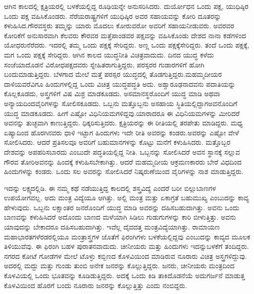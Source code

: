 ಆಗಿನ ಕಾಲದಲ್ಲಿ ಕ್ಷತ್ರಿಯರಲ್ಲಿ ಬಳಕೆಯಲ್ಲಿದ್ದ ರೂಢಿಯನ್ನೇ ಅನುಸರಿಸಿದರು. ದುರ್ಯೋಧನ ಒಂದು ಪಕ್ಷ, ಯುಧಿಷ್ಠಿರ ಒಂದು ಪಕ್ಷ ವಹಿಸಿಕೊಂಡರು. ನೆರೆಯ\break ರಾಷ್ಟ್ರಗಳಿಗೆ ಯುಧಿಷ್ಠಿರ ಅವರ ಸಹಾಯವನ್ನು ಕೋರಿ ದೂತರನ್ನು ಕಳುಹಿಸಿದ.\break ಗೌರವಸ್ಥರು ತಮ್ಮನ್ನು ಯಾರು ಮೊದಲು ಕೋರುವರೋ ಅವರಿಗೆ ಸಹಾಯ\break ನೀಡುವರು. ಅವರವರ ಕೋರಿಕೆಗೆ ಅನುಸಾರವಾಗಿ ಕೆಲವರು ಕೌರವರ ಮತ್ತೆ\break ಪಾಂಡವರ ಪಕ್ಷವನ್ನು ವಹಿಸಿಕೊಂಡು ದೇಶದ ನಾನಾ ಕಡೆಗಳಿಂದ ಯೋಧರು\break ನೆರೆದರು. ಇದರಲ್ಲಿ ತಮ್ಮ ಒಂದು ಪಕ್ಷಕ್ಕೆ ಸೇರಿದ್ದರು. ಅಣ್ಣ ಒಂದು ಪಕ್ಷಕ್ಕೆ\break ಸೇರಿದ್ದರು. ತಂದೆ ಒಂದು ಪಕ್ಷಕ್ಕೆ, ಮಗ ಒಂದು ಪಕ್ಷಕ್ಕೆ ಸೇರಿದ್ದರು. ಆಗಿನ ಕಾಲದ ಯುದ್ಧನೀತಿ ವಿಚಿತ್ರವಾದುದು. ದಿನದ ಯುದ್ಧ ಕಳೆದು ಸಂಜೆಯಾದೊಡನೆ ವಿರೋಧ\break ಪಕ್ಷದವರು ಸ್ನೇಹಿತರಾಗುತ್ತಿದ್ದರು, ಪರಸ್ಪರರ ಗುಡಾರಗಳಿಗೆ ಹೋಗಿ ಬಂದು\break ಮಾಡುತ್ತಿದ್ದರು. ಬೆಳಗಾದ ಮೇಲೆ ಮತ್ತೆ ಪರಸ್ಪರ ಯುದ್ಧದಲ್ಲಿ ತೊಡಗುತ್ತಿದ್ದರು.\break ಮಹಮ್ಮದೀಯರ ದಾಳಿಯವರೆವಿಗೂ ಹಿಂದುಗಳಲ್ಲಿದ್ದ ಒಂದು ವಿಚಿತ್ರ ಯುದ್ಧ\break ಪದ್ಧತಿ ಅದು. ಅಶ್ವಾರೂಢನಾದವನು ಪದಾತಿಯನ್ನು ಕೊಲ್ಲಕೂಡದು, ಅಸ್ತ್ರಗಳಿಗೆ ವಿಷ ಮಿಶ್ರ ಮಾಡಕೂಡದು. ಅಸಮಾನಸ್ಥರೊಂದಿಗೆ ಯುದ್ಧ ಮಾಡಿ ಅಥವಾ ಅನ್ಯಾಯದಿಂದ\break ವೈರಿಗಳನ್ನು ಸೋಲಿಸಕೂಡದು. ಒಬ್ಬನು ಮತ್ತೊಬ್ಬನು ಅಸಹಾಯ ಸ್ಥಿತಿಯಲ್ಲಿದ್ದಾಗ\break ಅವನೊಂದಿಗೆ ಯುದ್ಧ ಮಾಡಕೂಡದು. ಹೀಗೆ ಎಷ್ಟೋ ವಿಧಿನಿಯಮಗಳಿದ್ದವು.\break ಯಾರಾದರೂ ಈ ವಿಧಿನಿಯಮಗಳನ್ನು ಮೀರಿದರೆ ಅವನನ್ನು ತುಚ್ಛವಾಗಿ ಕಾಣುತ್ತಿದ್ದರು. ಧಿಕ್ಕರಿಸುತ್ತಿದರು. ಕ್ಷತ್ರಿಯರನ್ನು ಈ ರೀತಿಯಲ್ಲಿ ತರಪೇತು ಮಾಡಿದ್ದರು. ಮಧ್ಯ ಏಷ್ಯಾದಿಂದ ಹೊರಗಿನವರು ಧಾಳಿ ಇಟ್ಟಾಗ ಹಿಂದುಗಳು ಇದೇ ರೀತಿ ಅವರನ್ನು ಕಂಡರು.\break ಅವರನ್ನು ಎಷ್ಟೋ ವೇಳೆ ಸೋಲಿಸಿದರು. ಆದರೆ ಪ್ರತಿಸಲವೂ ಅವರಿಗೆ ಬಹುಮಾನಗಳನ್ನು ಕೊಟ್ಟು ಮನೆಗೆ ಕಳುಹಿಸಿದರು. ಮತ್ತೊಬ್ಬರ ದೇಶವನ್ನು ಅಪಹರಿಸಬಾರದು ಎಂಬುದೇ ಪದ್ಧತಿಯಲ್ಲಿದ್ದ ನೀತಿ. ಒಬ್ಬನನ್ನು ಸೋಲಿಸಿದರೆ ಅವನ ಸ್ಥಾನಕ್ಕೆ ಸಲ್ಲುವ ಗೌರವ ತೋರಿ\break ಅವನನ್ನು ಹಿಂದಕ್ಕೆ ಕಳುಹಿಸಬೇಕಾಗಿತ್ತು. ಆದರೆ ಮಹಮ್ಮದೀಯ ಆಕ್ರಮಣಕಾರರು ಬೇರೆ ವಿಧದಿಂದ ಹಿಂದುಗಳನ್ನು ಕಂಡರು. ಒಂದು ಸಲ ಅವರನ್ನು ಸೋಲಿಸಿದರೆ ನಿಷ್ಕರುಣೆಯಿಂದ ವೈರಿಗಳನ್ನು ನಾಶ ಮಾಡುತ್ತಿದ್ದರು.

\vskip 0.1cm

ಇದನ್ನು ಲಕ್ಷ್ಯದಲ್ಲಿಡಿ. ಈ ನಮ್ಮ ಕಥೆ ನಡೆಯುತ್ತಿದ್ದ ಕಾಲದಲ್ಲಿ ಶಸ್ತ್ರವಿದ್ಯೆ ಎಂದರೆ ಬರೀ ಬಿಲ್ಲುಬಾಣಗಳ ಉಪಯೋಗವಲ್ಲ. ಅದು ಮಂತ್ರ ವಿದ್ಯೆಯೂ ಆಗಿತ್ತು. ಅಲ್ಲಿ ಮಂತ್ರ ಮತ್ತು ಏಕಾಗ್ರತೆ ಬಹುಮುಖ್ಯ ಎಂಬುದನ್ನು ಕಾವ್ಯ ಹೇಳುವುದು. ಒಬ್ಬನು ಲಕ್ಷಾಂತರ ಜನರೊಂದಿಗೆ ಯುದ್ಧ ಮಾಡಿ ಅವರನ್ನು ದಹಿಸಬಹುದಾಗಿತ್ತು. ಅವನು ಒಂದು ಬಾಣವನ್ನು ಕಳುಹಿಸಿದರೆ ಅದೊಂದು ಬಾಣದ ಮಳೆಯಾಗಿ ಸಿಡಿಲು ಗುಡುಗುಗಳನ್ನು ಕಾರಿ ಬೀಳುತ್ತಿತ್ತು. ಅವನು ಯಾವುದನ್ನು ಬೇಕಾದರೂ ದಹಿಸಬಹುದಾಗಿತ್ತು. ಇವೆಲ್ಲ ದೈವದತ್ತ ಮಂತ್ರವಿದ್ಯೆಯಾಗಿತ್ತು. ರಾಮಾಯಣ ಮಹಾಭಾರತಗಳೆರಡರಲ್ಲಿಯೂ ಮಂತ್ರಾಸ್ತ್ರಗಳ ಜೊತೆಗೆ ಫಿರಂಗಿಗಳು ಬಳಕೆಯಲ್ಲಿದ್ದವು ಎಂಬುದನ್ನು ಕಾವ್ಯದ ಮೂಲಕ ತಿಳಿಯುವೆವು. ಈ ಫಿರಂಗಿ ಬಹಳ ಪುರಾತನವಾದುದು. ಚೀನೀಯರು ಮತ್ತು ಹಿಂದುಗಳು ಇದನ್ನು\break ಬಳಕೆಗೆ ತಂದಿದ್ದರು. ನಗರದ ಕೋಟೆ ಗೋಡೆಗಳ ಮೇಲೆ ಟೊಳ್ಳು ಕಬ್ಬಿಣದ ಕೊಳವಿಯಿಂದ ಮಾಡಿರುವ ನೂರಾರು ವಿಚಿತ್ರ ಅಸ್ತ್ರಗಳಿದ್ದುವು. ಅದರಲ್ಲಿ ಮದ್ದು ಮತ್ತು ಗುಂಡು ತುಂಬಿ ಅನೇಕ ಜನರನ್ನು ಕೊಲ್ಲುತ್ತಿದ್ದರು. ಜನರು, ಚೀನೀಯರು ಮಂತ್ರದಿಂದ ಕೊಳವಿಯಲ್ಲಿ ಒಂದು ಭೂತವನ್ನು ಕೂಡಿಡುತ್ತಿದ್ದರು. ಅದಕ್ಕೆ ಒಂದು ಕಿಡಿ ತಾಕಿದೊಡನೆಯೆ ಅದು\break ಗರ್ಜನೆ ಮಾಡುತ್ತ ಕೊಳವಿಯಿಂದ ಹೊರಗೆ ಬಂದು ನೂರಾರು ಜನರನ್ನು ಕೊಲ್ಲುತ್ತಿತ್ತು ಎಂದು ನಂಬಿದ್ದರು.

